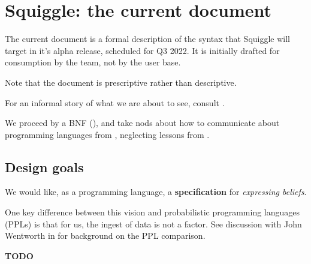 \documentclass[../main.tex]{subfiles}
\begin{document}
\section{Squiggle: the current document}

The current document is a formal description of the syntax that Squiggle will target in it's alpha release, scheduled for Q3 2022. It is initially drafted for consumption by the team, not by the user base.

Note that the document is prescriptive rather than descriptive.

For an informal story of what we are about to see, consult \cite{@SqgCodePlan}.

We proceed by a BNF (\cite{@BNFWiki}), and take nods about how to communicate about programming languages from \cite{@CraftingInterpreters, Appendix I}, neglecting lessons from \cite{@PFPL}.

\subsection{Design goals}

We would like, as a programming language, a \textbf{specification} for \textit{expressing beliefs}.

One key difference between this vision and probabilistic programming languages (PPLs) is that for us, the ingest of data is not a factor. See discussion with John Wentworth in \cite{@SqgSequence} for background on the PPL comparison.

\textbf{TODO}
\end{document}
